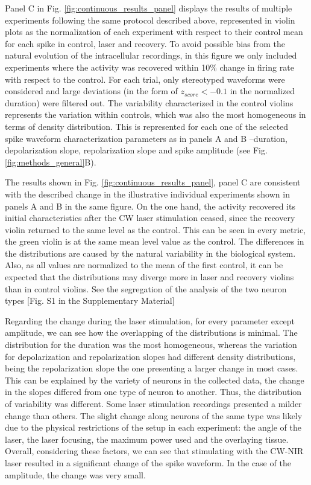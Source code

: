 Panel C in Fig. \ref{fig:continuous_results_panel} displays the results of multiple experiments following the same protocol described above, represented in violin plots as the normalization of each experiment with respect to their control mean for each spike in control, laser and recovery. To avoid possible bias from the natural evolution of the intracellular recordings, in this figure we only included experiments where the activity was recovered within 10\% change in firing rate with respect to the control. For each trial, only stereotyped waveforms were considered and large deviations (in the form of $z_{score} < -0.1$ in the normalized duration) were filtered out. The variability characterized in the control violins represents the variation within controls, which was also the most homogeneous in terms of density distribution. This is represented for each one of the selected spike waveform characterization parameters as in panels A and B --duration, depolarization slope, repolarization slope and spike amplitude (see Fig. \ref{fig:methods_general}B).

The results shown in Fig. \ref{fig:continuous_results_panel}, panel C are consistent with the described change in the illustrative individual experiments shown in panels A and B in the same figure. On the one hand, the activity recovered its initial characteristics after the CW laser stimulation ceased, since the recovery violin returned to the same level as the control. This can be seen in every metric, the green violin is at the same mean level value as the control. The differences in the distributions are caused by the natural variability in the biological system. Also, as all values are normalized to the mean of the first control, it can be expected that the distributions may diverge more in laser and recovery violins than in control violins. See the segregation of the analysis of the two neuron types [Fig. S1 in the Supplementary Material]

Regarding the change during the laser stimulation, for every parameter except amplitude, we can see how the overlapping of the distributions is minimal. The distribution for the duration was the most homogeneous, whereas the variation for depolarization and repolarization slopes had different density distributions, being the repolarization slope the one presenting a larger change in most cases. This can be explained by the variety of neurons in the collected data, the change in the slopes differed from one type of neuron to another. Thus, the distribution of variability was different. Some laser stimulation recordings presented a milder change than others. The slight change along neurons of the same type was likely due to the physical restrictions of the setup in each experiment: the angle of the laser, the laser focusing, the maximum power used and the overlaying tissue. Overall, considering these factors, we can see that stimulating with the CW-NIR laser resulted in a significant change of the spike waveform. In the case of the amplitude, the change was very small. 

